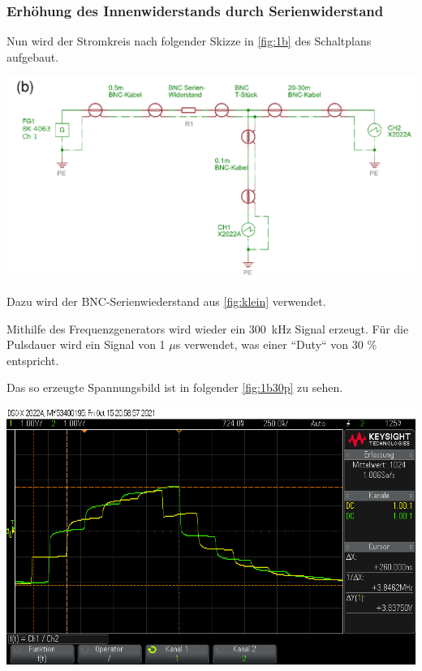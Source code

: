 \documentclass[11pt,ngerman]{scrartcl}
\begin{document}
\subsubsection{Erhöhung des Innenwiderstands durch Serienwiderstand}

Nun wird der Stromkreis nach folgender Skizze in \autoref{fig:1b} des Schaltplans aufgebaut.

\begin{center}
	\begin{minipage}[t]{0.8\textwidth}
		\includegraphics[width=\textwidth]{1b}
		\label{fig:1b}
	\end{minipage}
\end{center}

\noindent Dazu wird der BNC-Serienwiederstand aus \autoref{fig:klein} verwendet.

\noindent Mithilfe des Frequenzgenerators wird wieder ein \SI{300}{kHz} Signal erzeugt. Für die Pulsdauer wird ein Signal von 1 $\mu$s verwendet, was einer ``Duty`` von 30 \% entspricht.

\vspace{2mm}

\noindent Das so erzeugte Spannungsbild ist in folgender \autoref{fig:1b30p} zu sehen.

\begin{center}
	\begin{minipage}[t]{0.7\textwidth}
		\includegraphics[width=\textwidth]{oszi/scope_0_21}
		\label{fig:1b30p}
	\end{minipage}
\end{center}
\end{document}
